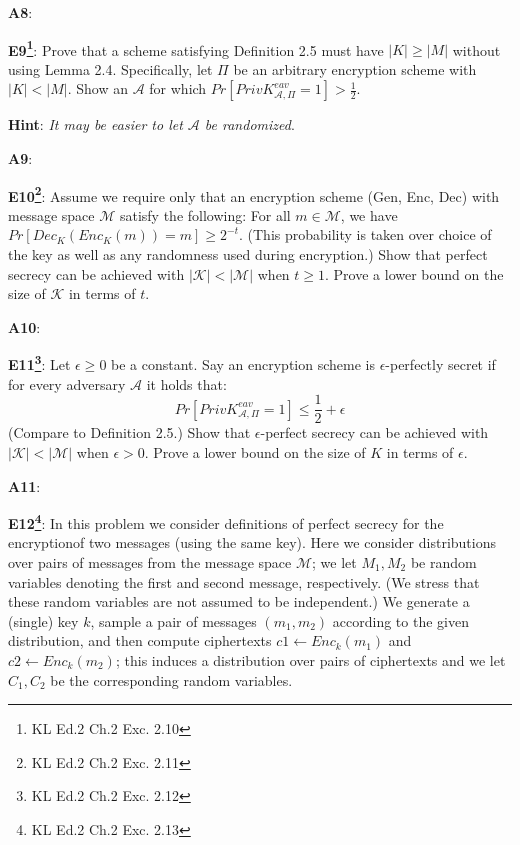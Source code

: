 \documentclass[12pt,reqno]{amsart}
\newcommand{\msgspc}[0]{\mathcal{M}}
\newcommand{\keyspc}[0]{\mathcal{K}}
\begin{document}
\textbf{A8}:  

\vspace{20px}
\textbf{E9\footnote{KL Ed.2 Ch.2 Exc. 2.10}}:  Prove that a scheme satisfying Definition 2.5 must have $|K| \geq |M|$ without using Lemma 2.4. Specifically, let $\Pi$ be an arbitrary encryption scheme with $|K| < |M|$. Show an $\mathcal{A}$ for which $Pr[PrivK^{eav}_{\mathcal{A},\Pi}=1] > \frac{1}{2}$. 

\textbf{Hint}: \textit{It may be easier to let $\mathcal{A}$ be randomized}.


\textbf{A9}:  

\vspace{20px}
\textbf{E10\footnote{KL Ed.2 Ch.2 Exc. 2.11}}:  Assume we require only that an encryption scheme (Gen,  Enc, Dec) with message space $\msgspc$ satisfy the following: For all $m \in \msgspc$, we have $Pr[Dec_K(Enc_K(m)) = m] \geq 2^{-t}$. (This probability is taken over choice of the key as well as any randomness used during encryption.) Show that perfect secrecy can be achieved with $|\keyspc| < |\msgspc|$ when $t \geq 1$. Prove a lower bound on the size of $\keyspc$ in terms of $t$.

\textbf{A10}:  

\vspace{20px}
\textbf{E11\footnote{KL Ed.2 Ch.2 Exc. 2.12}}:  Let $\epsilon \geq 0$ be a constant. Say an encryption scheme is $\epsilon$-perfectly secret if for every adversary $\mathcal{A}$ it holds that:
$$
Pr[PrivK^{eav}_{\mathcal{A},\Pi}=1] \leq \frac{1}{2} + \epsilon
$$
(Compare to Definition 2.5.) Show that $\epsilon$-perfect secrecy can be achieved with  $|\keyspc| < |\msgspc|$ when $\epsilon > 0$. Prove a lower bound on the size of $K$ in terms of $\epsilon$.

\textbf{A11}:  

\vspace{20px}
\textbf{E12\footnote{KL Ed.2 Ch.2 Exc. 2.13}}:  In this problem we consider definitions of perfect secrecy for the encryptionof two messages (using the same key). Here we consider distributions over pairs of messages from the message space $\msgspc$; we let $M_1,M_2$ be random variables denoting the first and second message, respectively. (We stress that these random variables are not assumed to be independent.) We generate a (single) key $k$, sample a pair of messages $(m_1,m_2)$ according to the given distribution, and then compute ciphertexts $c1 \xleftarrow{} Enc_k(m_1)$ and $c2  \xleftarrow{}  Enc_k(m_2)$; this induces a distribution over pairs of ciphertexts and we let $C_1,C_2$ be the corresponding random variables.
\end{document}
